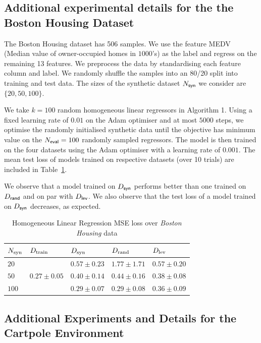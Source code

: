 \subsection{Additional experimental details for the the Boston Housing Dataset} \label{sec:expts-housing}

The Boston Housing dataset has 506 samples. We use the feature MEDV (Median value of owner-occupied homes in $1000$'s) as the label and regress on the remaining 13 features. 
We preprocess the data by standardising each feature column
and label. We randomly shuffle the samples into an 80/20 split into training and test data.
The sizes of the synthetic dataset $N_{\sf syn}$ we consider are $\{20, 50, 100\}$. 

We take $k = 100$ random homogeneous linear regressors in Algorithm 1. 
Using a fixed learning rate of $0.01$ on the {\sf Adam} optimiser and at most $5000$ steps, we optimise the randomly initialised synthetic data until the objective has minimum value on the $N_{\sf eval} = 100$ randomly sampled regressors. The model is then trained on the four datasets using the {\sf Adam} optimiser with a learning rate of $0.001$.
The mean test loss of models trained on respective datasets (over 10 trials) are included in Table~\ref{table4}.

We observe that a model trained on $D_{\sf syn}$ performs better than one trained on $D_{\sf rand}$ and on par with $D_{\sf lev}$. We also observe that the test loss of a model trained on $D_{\sf syn}$ decreases, as expected.

\begin{table}
\centering
\caption{Homogeneous Linear Regression MSE loss over {\it Boston Housing} data}\label{table4}
\begin{tabular}{ p{1.0cm}p{2.0cm}p{2.0cm}p{2.0cm}p{2.0cm} }
 \hline
  $N_{\textnormal{syn}}$ & $D_{\textnormal{train}}$ & $D_{\textnormal{syn}}$ & $D_{\textnormal{rand}}$ & $D_{\textnormal{lev}}$ \\
 \hline
  $20$ & & $0.57\pm0.23$ & $1.77\pm1.71$ & $0.57\pm0.20$\\
    $50$ & $0.27\pm0.05$ & $0.40 \pm 0.14$ & $0.44 \pm 0.16$ & $0.38\pm0.08$\\
 $100$ & & $0.29\pm0.07$ & $0.29\pm 0.08$& $0.36\pm0.09$\\
 \hline
\end{tabular}
\end{table}

\subsection{Additional Experiments and Details for the {Cartpole} Environment} \label{sec:expts-cartpole}

